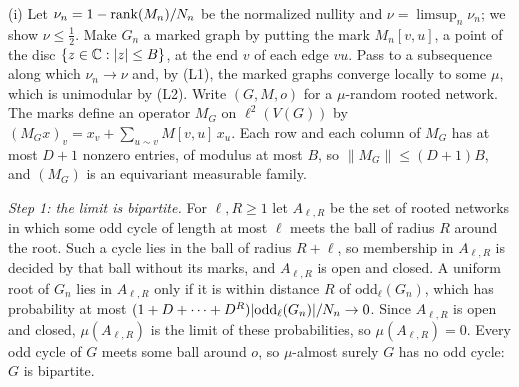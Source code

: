 \begin{informalproof}
(i) Let $\nu_n=1-\operatorname{rank}(M_n)/N_n$ be the normalized nullity and $\nu=\limsup_n\nu_n$; we show $\nu\le\frac12$. Make
$G_n$ a marked graph by putting the mark $M_n[v,u]$, a point of the disc $\{z\in\mathbb{C}:\lvert z \rvert\le B\}$, at the end $v$ of
each edge $vu$. Pass to a subsequence along which $\nu_n\to\nu$ and, by (L1), the marked graphs converge locally to some
$\mu$, which is unimodular by (L2). Write $(G,M,o)$ for a $\mu$-random rooted network. The marks define an operator $M_G$
on $\ell^2(V(G))$ by $(M_Gx)_v=x_v+\sum_{u\sim v}M[v,u]\,x_u$. Each row and each column of $M_G$ has at most $D+1$
nonzero entries, of modulus at most $B$, so $\lVert M_G\rVert\le(D+1)B$, and $(M_G)$ is an equivariant measurable
family.

\emph{Step 1: the limit is bipartite.} For $\ell,R\ge1$ let $A_{\ell,R}$ be the set of rooted networks in which some odd
cycle of length at most $\ell$ meets the ball of radius $R$ around the root. Such a cycle lies in the ball of radius
$R+\ell$, so membership in $A_{\ell,R}$ is decided by that ball without its marks, and $A_{\ell,R}$ is open and closed.
A uniform root of $G_n$ lies in $A_{\ell,R}$ only if it is within distance $R$ of $\mathrm{odd}_\ell(G_n)$, which has
probability at most $(1+D+\dots+D^R)\lvert \mathrm{odd}_\ell(G_n) \rvert/N_n\to0$. Since $A_{\ell,R}$ is open and closed,
$\mu(A_{\ell,R})$ is the limit of these probabilities, so $\mu(A_{\ell,R})=0$. Every odd cycle of $G$ meets some ball
around $o$, so $\mu$-almost surely $G$ has no odd cycle: $G$ is bipartite.


\end{informalproof}
